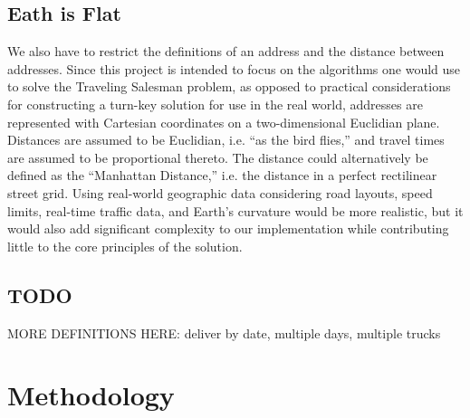 \documentclass[letterpaper]{article}
\begin{document}
    \subsection{Eath is Flat}
    \label{subection:Earth_is_Flat}
    We also have to restrict the definitions of an address and the distance between addresses. Since this project is intended to focus on the algorithms one would use to solve the Traveling Salesman problem, as opposed to practical considerations for constructing a turn-key solution for use in the real world, addresses are represented with Cartesian coordinates on a two-dimensional Euclidian plane. Distances are assumed to be Euclidian, i.e. ``as the bird flies,'' and travel times are assumed to be proportional thereto. The distance could alternatively be defined as the ``Manhattan Distance,'' i.e. the distance in a perfect rectilinear street grid. Using real-world geographic data considering road layouts, speed limits, real-time traffic data, and Earth's curvature would be more realistic, but it would also add significant complexity to our implementation while contributing little to the core principles of the solution.

    \subsection{TODO}
    MORE DEFINITIONS HERE: deliver by date, multiple days, multiple trucks

    \section{Methodology}
    \label{section:Methodology}
\end{document}
